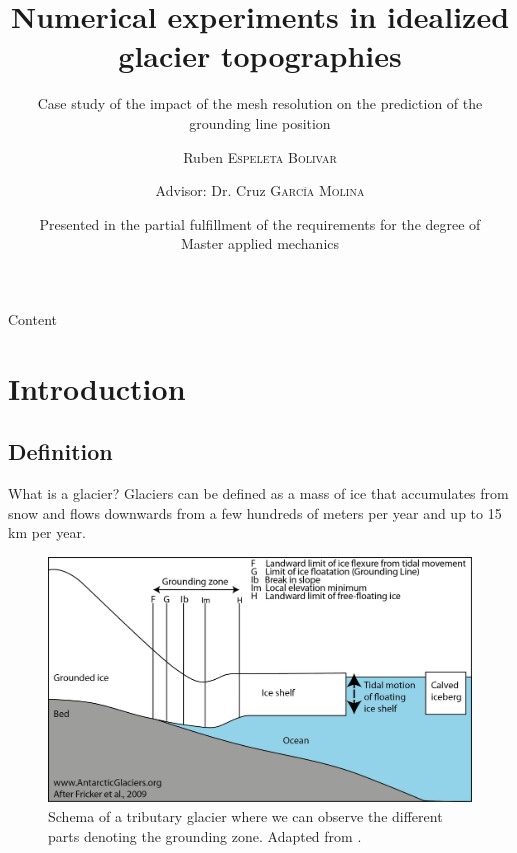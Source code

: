 \documentclass[11pt]{beamer}
\author{Ruben \textsc{Espeleta Bolivar} \\
	\and {Advisor: Dr. Cruz \textsc{García Molina}}}
\title[Numerical experiments]{Numerical experiments in idealized glacier topographies}
\date[KPT 2004]{Presented in the partial fulfillment of the requirements for the degree of \\
Master applied mechanics}
\subtitle{Case study of the impact of the mesh resolution on the prediction of the grounding line position}
\institute[IGE]{
	\inst{1}
	Institut des geosciences de l'environnement
}
\begin{document}
	\begin{frame}
		\maketitle
	\end{frame}
	
	\begin{frame}{Content}
		\tableofcontents[hideallsubsections]
	\end{frame}
	
	\section{Introduction}
	\subsection{Definition}
		\begin{frame}{What is a glacier?}
		\justifying
		Glaciers can be defined as a mass of ice that accumulates from snow and flows downwards from a few hundreds of meters per year and up to 15 km per year.\pause
		\begin{figure}
		\centering
		\includegraphics[scale=0.4]{../fig/groundingzone.png}
		\caption{Schema of a tributary glacier where we can observe the different parts denoting the grounding zone. Adapted from \cite{fricker2009mapping}. }
		\label{Glacier}
		\end{figure}
		\end{frame}
\end{document}
